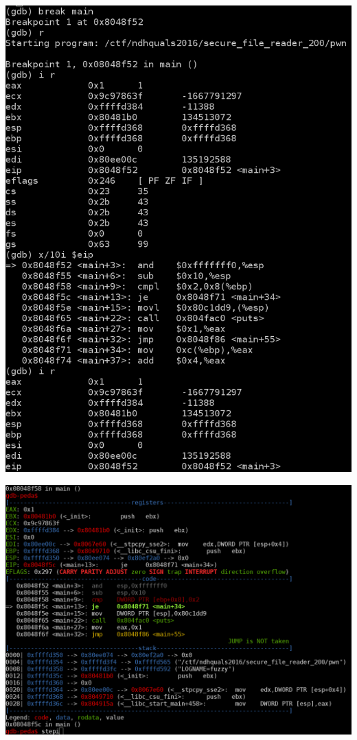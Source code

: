 {
\begin{frame}[plain]
  \begin{center}
    \includegraphics[height=\textheight]{../images/gdb-plain.png}
  \end{center}
\end{frame}

\begin{frame}[plain]
  \begin{center}
    \includegraphics[width=\textwidth]{../images/gdb-peda.png}
  \end{center}
\end{frame}
}

